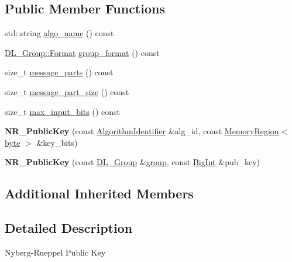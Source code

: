\subsection*{Public Member Functions}
\begin{DoxyCompactItemize}
\item 
std\-::string \hyperlink{classBotan_1_1NR__PublicKey_abc312ff7e87465a95ae245dc804f2742}{algo\-\_\-name} () const 
\item 
\hyperlink{classBotan_1_1DL__Group_ac602a30420ceec03fa181a10b09312a7}{D\-L\-\_\-\-Group\-::\-Format} \hyperlink{classBotan_1_1NR__PublicKey_ab72e650d1b075e6925208b810b608b55}{group\-\_\-format} () const 
\item 
size\-\_\-t \hyperlink{classBotan_1_1NR__PublicKey_ae0f8398ba601c4efe1a220ffa5b26fad}{message\-\_\-parts} () const 
\item 
size\-\_\-t \hyperlink{classBotan_1_1NR__PublicKey_acd0869ee65d1c9794ff6f9911baa8124}{message\-\_\-part\-\_\-size} () const 
\item 
size\-\_\-t \hyperlink{classBotan_1_1NR__PublicKey_a84e1f22e455dd7fa302121731bde734e}{max\-\_\-input\-\_\-bits} () const 
\item 
\hypertarget{classBotan_1_1NR__PublicKey_a78816c2f6260f8660edb516b91d91782}{{\bfseries N\-R\-\_\-\-Public\-Key} (const \hyperlink{classBotan_1_1AlgorithmIdentifier}{Algorithm\-Identifier} \&alg\-\_\-id, const \hyperlink{classBotan_1_1MemoryRegion}{Memory\-Region}$<$ \hyperlink{namespaceBotan_a7d793989d801281df48c6b19616b8b84}{byte} $>$ \&key\-\_\-bits)}\label{classBotan_1_1NR__PublicKey_a78816c2f6260f8660edb516b91d91782}

\item 
\hypertarget{classBotan_1_1NR__PublicKey_aa2f459680f76c510c463ef58834114b3}{{\bfseries N\-R\-\_\-\-Public\-Key} (const \hyperlink{classBotan_1_1DL__Group}{D\-L\-\_\-\-Group} \&\hyperlink{classBotan_1_1DL__Scheme__PublicKey_a99e61704126f6c0fcdf5475027a46500}{group}, const \hyperlink{classBotan_1_1BigInt}{Big\-Int} \&pub\-\_\-key)}\label{classBotan_1_1NR__PublicKey_aa2f459680f76c510c463ef58834114b3}

\end{DoxyCompactItemize}
\subsection*{Additional Inherited Members}


\subsection{Detailed Description}
Nyberg-\/\-Rueppel Public Key 

